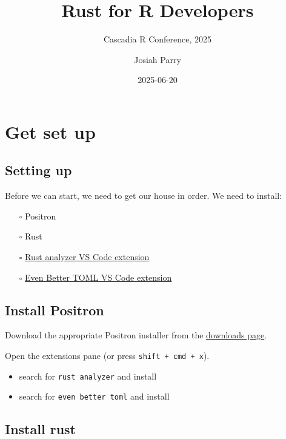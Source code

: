 \documentclass[
  letterpaper,
  DIV=11,
  numbers=noendperiod,
  oneside]{scrreprt}
\title{Rust for R Developers}
\subtitle{Cascadia R Conference, 2025}
\author{Josiah Parry}
\date{2025-06-20}
\providecommand{\tightlist}{%
  \setlength{\itemsep}{0pt}\setlength{\parskip}{0pt}}\usepackage{longtable,booktabs,array}
\renewcommand*\contentsname{Table of contents}
\newcommand\contentsname{Table of contents}
\begin{document}
\maketitle

\renewcommand*\contentsname{Table of contents}
{
\hypersetup{linkcolor=}
\setcounter{tocdepth}{2}
\tableofcontents
}


\chapter{Get set up}\label{get-set-up}

\section{Setting up}\label{setting-up}

Before we can start, we need to get our house in order. We need to
install:

\begin{itemize}
\tightlist
\item[$\square$]
  Positron
\item[$\square$]
  Rust
\item[$\square$]
  \href{https://marketplace.visualstudio.com/items?itemName=rust-lang.rust-analyzer}{Rust
  analyzer VS Code extension}
\item[$\square$]
  \href{https://marketplace.visualstudio.com/items?itemName=tamasfe.even-better-toml}{Even
  Better TOML VS Code extension}
\end{itemize}

\section{Install Positron}\label{install-positron}

Download the appropriate Positron installer from the
\href{https://positron.posit.co/download.html}{downloads page}.

Open the extensions pane (or press \texttt{shift\ +\ cmd\ +\ x}).

\begin{itemize}
\tightlist
\item
  search for \texttt{rust\ analyzer} and install
\item
  search for \texttt{even\ better\ toml} and install
\end{itemize}

\section{Install rust}\label{install-rust}
\end{document}

